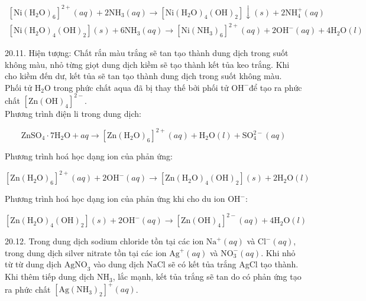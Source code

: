 \documentclass[10pt]{article}
\begin{document}
$$
\begin{gathered}
{\left[\mathrm{Ni}\left(\mathrm{H}_{2} \mathrm{O}\right)_{6}\right]^{2+}(a q)+2 \mathrm{NH}_{3}(a q) \rightarrow\left[\mathrm{Ni}\left(\mathrm{H}_{2} \mathrm{O}\right)_{4}(\mathrm{OH})_{2}\right] \downarrow(s)+2 \mathrm{NH}_{4}^{+}(a q)} \\
{\left[\mathrm{Ni}\left(\mathrm{H}_{2} \mathrm{O}\right)_{4}(\mathrm{OH})_{2}\right](s)+6 \mathrm{NH}_{3}(a q) \rightarrow\left[\mathrm{Ni}\left(\mathrm{NH}_{3}\right)_{6}\right]^{2+}(a q)+2 \mathrm{OH}^{-}(a q)+4 \mathrm{H}_{2} \mathrm{O}(l)}
\end{gathered}
$$

20.11. Hiện tượng: Chất rắn màu trắng sẽ tan tạo thành dung dịch trong suốt không màu, nhỏ từng giọt dung dịch kiềm sẽ tạo thành kết tủa keo trắng. Khi cho kiềm đến dư, kết tủa sẽ tan tạo thành dung dịch trong suốt không màu.\\
Phối tử $\mathrm{H}_{2} \mathrm{O}$ trong phức chất aqua đã bị thay thế bởi phối tử $\mathrm{OH}^{-}$để tạo ra phức chất $\left[\mathrm{Zn}(\mathrm{OH})_{4}\right]^{2-}$.\\
Phương trình điện li trong dung dịch:

$$
\mathrm{ZnSO}_{4} \cdot 7 \mathrm{H}_{2} \mathrm{O}+a q \rightarrow\left[\mathrm{Zn}\left(\mathrm{H}_{2} \mathrm{O}\right)_{6}\right]^{2+}(a q)+\mathrm{H}_{2} \mathrm{O}(l)+\mathrm{SO}_{4}^{2-}(a q)
$$

Phương trình hoá học dạng ion của phản ứng:

$$
\left[\mathrm{Zn}\left(\mathrm{H}_{2} \mathrm{O}\right)_{6}\right]^{2+}(a q)+2 \mathrm{OH}^{-}(a q) \rightarrow\left[\mathrm{Zn}\left(\mathrm{H}_{2} \mathrm{O}\right)_{4}(\mathrm{OH})_{2}\right](s)+2 \mathrm{H}_{2} \mathrm{O}(l)
$$

Phương trình hoá học dạng ion của phản ứng khi cho du ion $\mathrm{OH}^{-}$:

$$
\left[\mathrm{Zn}\left(\mathrm{H}_{2} \mathrm{O}\right)_{4}(\mathrm{OH})_{2}\right](s)+2 \mathrm{OH}^{-}(a q) \rightarrow\left[\mathrm{Zn}(\mathrm{OH})_{4}\right]^{2-}(a q)+4 \mathrm{H}_{2} \mathrm{O}(l)
$$

20.12. Trong dung dịch sodium chloride tồn tại các ion $\mathrm{Na}^{+}(a q)$ và $\mathrm{Cl}^{-}(a q)$, trong dung dịch silver nitrate tồn tại các ion $\mathrm{Ag}^{+}(a q)$ và $\mathrm{NO}_{3}^{-}(a q)$. Khi nhỏ từ từ dung dịch $\mathrm{AgNO}_{3}$ vào dung dịch NaCl sẽ có kết tủa trắng AgCl tạo thành. Khi thêm tiếp dung dịch $\mathrm{NH}_{3}$, lắc mạnh, kết tủa trắng sẽ tan do có phản ứng tạo ra phức chất $\left[\mathrm{Ag}\left(\mathrm{NH}_{3}\right)_{2}\right]^{+}(a q)$.
\end{document}
